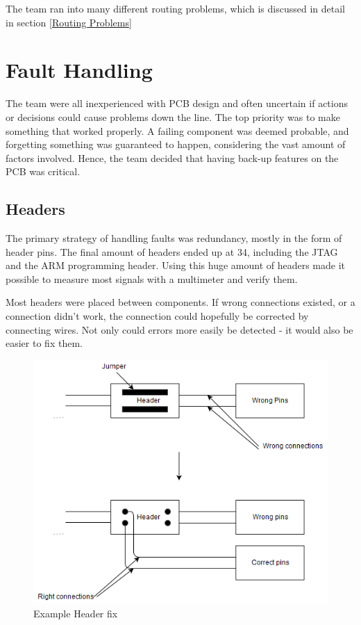 The team ran into many different routing problems, which is discussed in detail in section \ref{Routing Problems}

\section{Fault Handling}
The team were all inexperienced with PCB design and often uncertain if actions or decisions could cause problems down the line. 
The top priority was to make something that worked properly. 
A failing component was deemed probable, and forgetting something was guaranteed to happen, considering the vast amount of factors involved. 
Hence, the team decided that having back-up features on the PCB was critical.

\subsection{Headers}
The primary strategy of handling faults was redundancy, mostly in the form of header pins. 
The final amount of headers ended up at 34, including the JTAG and the ARM programming header. 
Using this huge amount of headers made it possible to measure most signals with a multimeter and verify them. 

Most headers were placed between components. 
If wrong connections existed, or a connection didn't work, the connection could hopefully be corrected by connecting wires. 
Not only could errors more easily be detected - it would also be easier to fix them.

\begin{figure}[h!]
\centering
\includegraphics[scale = 0.45]{images/Header_fix.png}
\caption{Example Header fix}
\label{fig:Header fix}
\end{figure}

